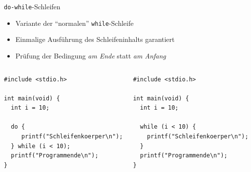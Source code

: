 \begin{frame}[fragile]{\texttt{do-while}-Schleifen}
%
\begin{itemize}
\item Variante der \enquote{normalen} \texttt{while}-Schleife
\item Einmalige Ausführung des Schleifeninhalts garantiert
\item Prüfung der Bedingung \emph{am Ende} statt \emph{am Anfang}
\end{itemize}
%
\begin{columns}[T]
\begin{codebox}
\begin{verbatim}
#include <stdio.h>

int main(void) {
  int i = 10;
  
  do {
     printf("Schleifenkoerper\n");
  } while (i < 10);
  printf("Programmende\n");
}
\end{verbatim}
%
\end{codebox}
%
\begin{codebox}
\begin{verbatim}
#include <stdio.h>

int main(void) {
  int i = 10;

  while (i < 10) {
    printf("Schleifenkoerper\n");
  }
  printf("Programmende\n");
}
\end{verbatim}
\end{codebox}
\end{columns}
%
\end{frame}


